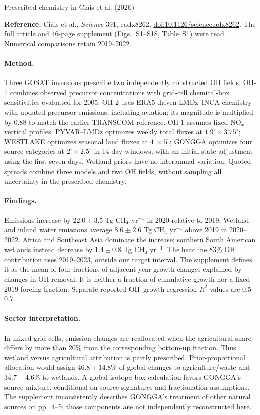 \documentclass[11pt]{article}
\begin{document}
\begin{center}\large Prescribed chemistry in Ciais et al. (2026)\end{center}
\noindent\textbf{Reference.} Ciais et al., \emph{Science} 391, eadx8262,
\href{https://doi.org/10.1126/science.adx8262}{doi:10.1126/science.adx8262}.
The full article and 46-page supplement (Figs.~S1--S18, Table~S1) were read.
Numerical comparisons retain 2019--2022.

\paragraph{Method.} Three GOSAT inversions prescribe two independently
constructed OH fields. OH-1 combines observed precursor concentrations with
grid-cell chemical-box sensitivities evaluated for 2005. OH-2 uses ERA5-driven
LMDz--INCA chemistry with updated precursor emissions, including aviation;
its magnitude is multiplied by 0.88 to match the earlier TRANSCOM reference.
OH-1 assumes fixed NO$_x$ vertical profiles. PYVAR--LMDz optimizes weekly total
fluxes at $1.9^\circ\times3.75^\circ$; WESTLAKE optimizes seasonal land fluxes
at $4^\circ\times5^\circ$; GONGGA optimizes four source categories at
$2^\circ\times2.5^\circ$ in 14-day windows, with an initial-state adjustment
using the first seven days. Wetland priors have no interannual variation.
Quoted spreads combine three models and two OH fields, without sampling
all uncertainty in the prescribed chemistry.

\paragraph{Findings.} Emissions increase by $22.0\pm3.5$ Tg CH$_4$ yr$^{-1}$
in 2020 relative to 2019. Wetland and inland water emissions average
$8.6\pm2.6$ Tg CH$_4$ yr$^{-1}$ above 2019 in 2020--2022. Africa and
Southeast Asia dominate the increase; southern South American wetlands
instead decrease by $1.4\pm0.8$ Tg CH$_4$ yr$^{-1}$.
The headline 83\% OH contribution uses 2019--2023, outside our target interval.
The supplement defines it as the mean of four fractions of adjacent-year
growth changes explained by changes in OH removal. It is neither a fraction
of cumulative growth nor a fixed-2019 forcing fraction. Separate reported
OH--growth regression $R^2$ values are 0.5--0.7.

\paragraph{Sector interpretation.} In mixed grid cells, emission changes are
reallocated when the agricultural share differs by more than 20\% from the
corresponding bottom-up fraction. Thus wetland versus agricultural
attribution is partly prescribed. Prior-proportional allocation would assign
$46.8\pm14.8$\% of global changes to agriculture/waste and
$34.7\pm4.6$\% to wetlands. A global isotope-box calculation favors GONGGA's
source mixture, conditional on source signatures and fractionation assumptions.
The supplement inconsistently describes GONGGA's treatment of other natural
sources on pp.~4--5; those components are not independently reconstructed here.
\end{document}
